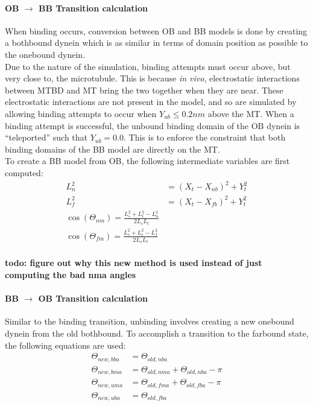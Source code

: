 \documentclass[10pt]{article} %
\begin{document}
\paragraph{OB $\rightarrow$ BB Transition calculation}
When binding occurs, conversion between OB and BB models is done by creating a bothbound dynein which is as similar in terms of domain position as possible to the onebound dynein.\\

Due to the nature of the simulation, binding attempts must occur above, but very close to, the microtubule. This is because \textit{in vivo}, electrostatic interactions between MTBD and MT bring the two together when they are near. These electrostatic interactions are not present in the model, and so are simulated by allowing binding attempts to occur when $Y_{ub} \leq 0.2nm$ above the MT. When a binding attempt is successful, the unbound binding domain of the OB dynein is ``teleported'' such that $Y_{ub} = 0.0$. This is to enforce the constraint that both binding domains of the BB model are directly on the MT.\\

To create a BB model from OB, the following intermediate variables are first computed:\\

\begin{align}
  L_n^2 &= \left(X_t - X_{nb}\right)^2 + Y_t^2\\
  L_f^2 &= \left(X_t - X_{fb}\right)^2 + Y_t^2\\
  \cos(\Theta_{nm}) = \frac{L_s^2 + L_t^2 - L_n^2}{2L_sL_t}\\
  \cos(\Theta_{fm}) = \frac{L_s^2 + L_t^2 - L_f^2}{2L_sL_t}\\
\end{align}

\textbf{todo: figure out why this new method is used instead of just computing the bad nma angles}

\paragraph{BB $\rightarrow$ OB Transition calculation}
Similar to the binding transition, unbinding involves creating a new onebound dynein from the old bothbound. To accomplish a transition to the farbound state, the following equations are used:\\

\begin{align}
  \Theta_{new,bba} &= \Theta_{old,nba}\\
  \Theta_{new,bma} &= \Theta_{old,nma} + \Theta_{old,nba} - \pi\\
  \Theta_{new,uma} &= \Theta_{old,fma} + \Theta_{old,fba} - \pi\\
  \Theta_{new,uba} &= \Theta_{old,fba}\\
\end{align}
\end{document}
